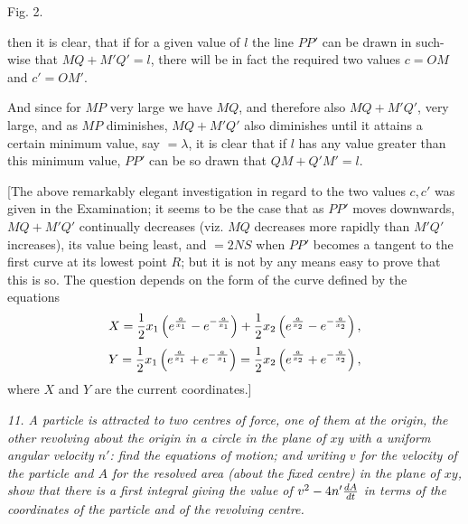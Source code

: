 \documentclass[11pt,a4paper]{article}
\theoremstyle{plain}
\theoremstyle{definition}
\begin{document}
\begin{center}
\par Fig. 2.
\end{center}

then it is clear, that if for a given value of $l$ the line $PP'$ can be drawn in such-wise that $MQ+M'Q'=l$, there will be in fact the required two values $c=OM$ and $c'=OM'$.

And since for $MP$ very large we have $MQ$, and therefore also $MQ+M'Q'$, very large, and as $MP$ diminishes, $MQ+M'Q'$ also diminishes until it attains a certain minimum value, say $=\lambda$, it is clear that if $l$ has any value greater than this minimum value, $PP'$ can be so drawn that $QM+Q'M'=l$.

[The above remarkably elegant investigation in regard to the two values $c,c'$ was given in the Examination; it seems to be the case that as $PP'$ moves downwards, $MQ+M'Q'$ continually decreases (viz. $MQ$ decreases more rapidly than $M'Q'$ increases), its value being least, and $=2NS$ when $PP'$ becomes a tangent to the first curve at its lowest point $R$; but it is not by any means easy to prove that this is so. The question depends on the form of the curve defined by the equations
\[
X={1\over2}x_1\left(e^{a\over x_1}-e^{-{a\over x_1}}\right)
+{1\over2}x_2\left(e^{a\over x_2}-e^{-{a\over x_2}}\right),
\]
\[
Y={1\over2}x_1\left(e^{a\over x_1}+e^{-{a\over x_1}}\right)
={1\over2}x_2\left(e^{a\over x_2}+e^{-{a\over x_2}}\right),
\]
where $X$ and $Y$ are the current coordinates.]

\newpage

\noindent\textit{11. A particle is attracted to two centres of force, one of them at the origin, the other revolving about the origin in a circle in the plane of $xy$ with a uniform angular velocity $n'$: find the equations of motion; and writing $v$ for the velocity of the particle and $A$ for the resolved area (about the fixed centre) in the plane of $xy$, show that there is a first integral giving the value of $v^2-4n'{dA\over dt}$ in terms of the coordinates of the particle and of the revolving centre.}
\end{document}
